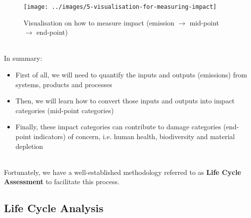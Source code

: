 \documentclass[../summary.tex]{subfiles}
\begin{document}
	\begin{figure}[H]
		\centering
		\texttt{[image: ../images/5-visualisation-for-measuring-impact]}
		\caption{Visualisation on how to measure impact (emission $\rightarrow$ mid-point $\rightarrow$ end-point)}
		\label{fig:5-visualisation-for-measuring-impact}
	\end{figure}
	\ \\
	In summary:
	\begin{itemize}
		\item First of all, we will need to quantify the inputs and outputs (emissions) from systems, products and processes
		\item Then, we will learn how to convert those inputs and outputs into impact categories (mid-point categories)
		\item Finally, these impact categories can contribute to damage categories (end-point indicators) of concern, i.e. human health, biodiversity and material depletion
	\end{itemize}
	\ \\
	Fortunately, we have a well-established methodology referred to as \textbf{Life Cycle Assessment} to facilitate this process.
	
	\subsection{Life Cycle Analysis}
	
\end{document}
